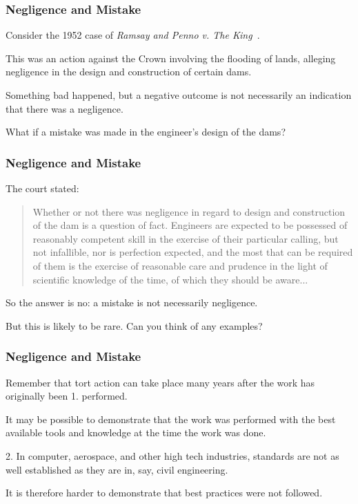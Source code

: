 \begin{frame}
\frametitle{Negligence and Mistake}

Consider the 1952 case of \textit{Ramsay and Penno v. The King}~\cite{lpe}.

This was an action against the Crown involving the flooding of lands, alleging negligence in the design and construction of certain dams.

Something bad happened, but a negative outcome is not necessarily an indication that there was a negligence.

What if a mistake was made in the engineer's design of the dams?

\end{frame}



\begin{frame}
\frametitle{Negligence and Mistake}

The court stated:

\begin{quote}
	Whether or not there was negligence in regard to design and construction of the dam is a question of fact. Engineers are expected to be possessed of reasonably competent skill in the exercise of their particular calling, but not infallible, nor is perfection expected, and the most that can be required of them is the exercise of reasonable care and prudence in the light of scientific knowledge of the time, of which they should be aware...
\end{quote}

So the answer is no: a mistake is not necessarily negligence.

But this is likely to be rare. Can you think of any examples?

\end{frame}



\begin{frame}
\frametitle{Negligence and Mistake}

Remember that tort action can take place many years after the work has originally been 1. performed.

It may be possible to demonstrate that the work was performed with the best available tools and knowledge at the time the work was done.

2. In computer, aerospace, and other high tech industries, standards are not as well established as they are in, say, civil engineering.

It is therefore harder to demonstrate that best practices were not followed.

\end{frame}




